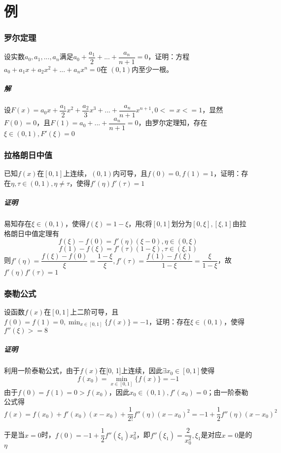 \section{例}

\subsubsection{罗尔定理}
设实数\(a_0, a_1, ..., a_n\)满足\(a_0 + \dfrac{a_1}{2} + ... + \dfrac{a_n}{n + 1} = 0\)，证明：方程\(a_0 + a_1x + a_2x^2 + ... + a_nx^n = 0\)在 \((0, 1)\)内至少一根。

\subparagraph{解}
设\(F(x) = a_0x + \dfrac{a_1}{2}x^2 + \dfrac{a_2}{3}x^3 + ... + \dfrac{a_n}{n + 1}x^{n + 1}, 0 <= x <= 1\)，显然\(F(0) = 0\)，且\(F(1) = a_0 + ... + \dfrac{a_n}{n + 1} = 0\)，由罗尔定理知，存在\(\xi \in (0, 1), F'(\xi) = 0\)


\subsubsection{拉格朗日中值}
已知\(f(x)\)在\([0, 1]\)上连续，\((0, 1)\)内可导，且\(f(0) = 0, f(1) = 1\)，证明：存在\(\eta, \tau \in (0, 1), \eta \neq \tau\)，使得\(f'(\eta)f'(\tau) = 1\)

\subparagraph{证明}
易知存在\(\xi \in (0, 1)\)，使得\(f(\xi) = 1 - \xi\)，用\(\xi\)将\([0, 1]\)划分为\([0, \xi], [\xi, 1]\)由拉格朗日中值定理有\[f(\xi) - f(0) = f'(\eta)(\xi - 0), \eta \in (0, \xi)\]
\[f(1) - f(\xi) = f'(\tau)(1 - \xi), \tau \in (\xi, 1)\]
则\(f'(\eta) = \dfrac{f(\xi) - f(0)}{\xi} = \dfrac{1 - \xi}{\xi}, f'(\tau) = \dfrac{f(1) - f(\xi)}{1 - \xi} = \dfrac{\xi}{1 - \xi}\)，故\(f'(\eta)f'(\tau) = 1\)


\subsubsection{泰勒公式}
设函数\(f(x)\)在\([0, 1]\)上二阶可导，且\(f(0) = f(1) = 0, \displaystyle \min_{x \in [0, 1]}\{f(x)\} = -1\)，证明：存在\(\xi \in (0, 1)\)，使得\(f''(\xi) >= 8\)

\subparagraph{证明}
利用一阶泰勒公式，由于\(f(x)\)在[0, 1]上连续，因此\(\exists x_0 \in [0, 1]\)使得\[f(x_0) = \displaystyle\min_{x \in [0, 1]}\{f(x)\} = -1\]
由于\(f(0) = f(1) = 0 > f(x_0)\)，因此\(x_0 \in (0, 1), f'(x_0) = 0\)；由一阶泰勒公式得\[f(x) = f(x_0) + f'(x_0)(x - x_0) + \dfrac{1}{2!}f''(\eta)(x - x_0)^2 = -1 + \dfrac{1}{2}f''(\eta)(x - x_0)^2\]

于是当\(x = 0\)时，\(f(0) = -1 + \dfrac{1}{2}f''(\xi_1)x_0^2\)，即\(f''(\xi_1) = \dfrac{2}{x_0^2}, \xi_1\)是对应\(x = 0\)是的\(\eta\)

